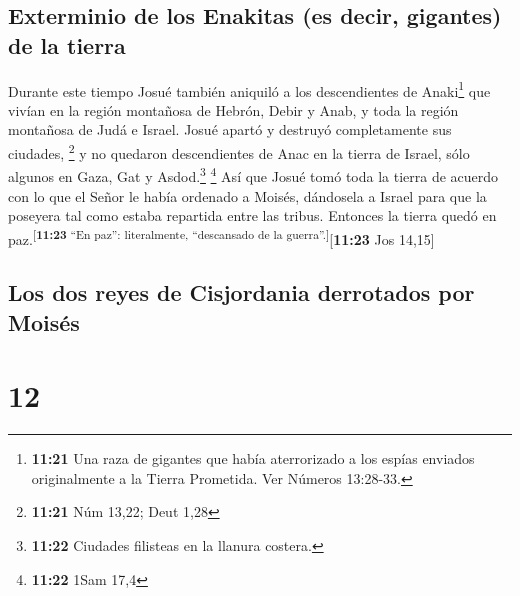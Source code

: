 \hypertarget{exterminio-de-los-enakitas-es-decir-gigantes-de-la-tierra}{%
\subsection{Exterminio de los Enakitas (es decir, gigantes) de la
tierra}\label{exterminio-de-los-enakitas-es-decir-gigantes-de-la-tierra}}

 Durante este tiempo Josué también aniquiló a los
descendientes de Anaki\footnote{\textbf{11:21} Una raza de gigantes que
  había aterrorizado a los espías enviados originalmente a la Tierra
  Prometida. Ver Números 13:28-33.} que vivían en la región montañosa de
Hebrón, Debir y Anab, y toda la región montañosa de Judá e Israel. Josué
apartó y destruyó completamente sus ciudades, \footnote{\textbf{11:21}
  Núm 13,22; Deut 1,28}  y no quedaron descendientes de
Anac en la tierra de Israel, sólo algunos en Gaza, Gat y
Asdod.\footnote{\textbf{11:22} Ciudades filisteas en la llanura costera.}
\footnote{\textbf{11:22} 1Sam 17,4}  Así que Josué tomó
toda la tierra de acuerdo con lo que el Señor le había ordenado a
Moisés, dándosela a Israel para que la poseyera tal como estaba
repartida entre las tribus. Entonces la tierra quedó en
paz.\textsuperscript{{[}\textbf{11:23} ``En paz'': literalmente,
``descansado de la guerra''.{]}}{[}\textbf{11:23} Jos 14,15{]}

\hypertarget{los-dos-reyes-de-cisjordania-derrotados-por-moisuxe9s}{%
\subsection{Los dos reyes de Cisjordania derrotados por
Moisés}\label{los-dos-reyes-de-cisjordania-derrotados-por-moisuxe9s}}

\hypertarget{section-11}{%
\section{12}\label{section-11}}

